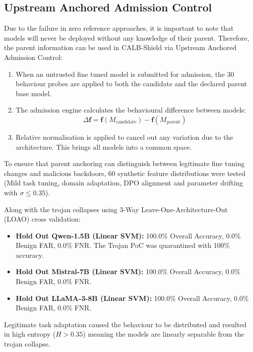 \documentclass[conference]{IEEEtran}
\begin{document}
\subsection{Upstream Anchored Admission Control}
\label{subsec:rq1_upstream}
Due to the failure in zero reference approaches, it is important to note that models will never be deployed without any knowledge of their parent. Therefore, the parent information can be used in CALB-Shield via Upstream Anchored Admission Control:
\begin{enumerate}
    \item When an untrusted fine tuned model is submitted for admission, the 30 behaviour probes are applied to both the candidate and the declared parent base model.
    \item The admission engine calculates the behavioural difference between models:
    \begin{equation}
    \Delta \mathbf{f} = \mathbf{f}(M_{\text{candidate}}) - \mathbf{f}(M_{\text{parent}})
    \end{equation}
    \item Relative normalisation is applied to cancel out any variation due to the architecture. This brings all models into a common space.
\end{enumerate}

To ensure that parent anchoring can distinguish between legitimate fine tuning changes and malicious backdoors, 60 synthetic feature distributions were tested (Mild task tuning, domain adaptation, DPO alignment and parameter drifting with $\sigma \le 0.35$).

Along with the trojan collapses using 3-Way Leave-One-Architecture-Out (LOAO) cross validation:
\begin{itemize}
    \item \textbf{Hold Out Qwen-1.5B (Linear SVM):} 100.0\% Overall Accuracy, 0.0\% Benign FAR, 0.0\% FNR. The Trojan PoC was quarantined with 100\% accuracy.
    \item \textbf{Hold Out Mistral-7B (Linear SVM):} 100.0\% Overall Accuracy, 0.0\% Benign FAR, 0.0\% FNR.
    \item \textbf{Hold Out LLaMA-3-8B (Linear SVM):} 100.0\% Overall Accuracy, 0.0\% Benign FAR, 0.0\% FNR.
\end{itemize}
Legitimate task adaptation caused the behaviour to be distributed and resulted in high entropy ($H > 0.35$) meaning the models are linearly separable from the trojan collapse.
\end{document}
